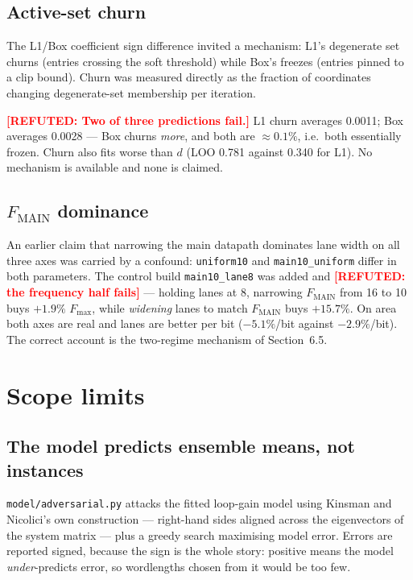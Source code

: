 \documentclass[11pt,a4paper]{article}
\newcommand{\refuted}[1]{\textcolor{red}{\textbf{[REFUTED: #1]}}}
\begin{document}
\subsection{Active-set churn}
The L1/Box coefficient sign difference invited a mechanism: L1's degenerate set
churns (entries crossing the soft threshold) while Box's freezes (entries
pinned to a clip bound). Churn was measured directly as the fraction of
coordinates changing degenerate-set membership per iteration.

\refuted{Two of three predictions fail.} L1 churn averages 0.0011; Box averages
0.0028 --- Box churns \emph{more}, and both are $\approx 0.1\%$, i.e.\ both
essentially frozen. Churn also fits worse than $d$ (LOO 0.781 against 0.340 for
L1). No mechanism is available and none is claimed.

\subsection{$F_{\text{MAIN}}$ dominance}
An earlier claim that narrowing the main datapath dominates lane width on all
three axes was carried by a confound: \texttt{uniform10} and
\texttt{main10\_uniform} differ in both parameters. The control build
\texttt{main10\_lane8} was added and \refuted{the frequency half fails} ---
holding lanes at 8, narrowing $F_{\text{MAIN}}$ from 16 to 10 buys $+1.9\%$
$F_{\max}$, while \emph{widening} lanes to match $F_{\text{MAIN}}$ buys
$+15.7\%$. On area both axes are real and lanes are better per bit
($-5.1\%$/bit against $-2.9\%$/bit). The correct account is the two-regime
mechanism of Section~6.5.

\section{Scope limits}

\subsection{The model predicts ensemble means, not instances}

\texttt{model/adversarial.py} attacks the fitted loop-gain model using Kinsman
and Nicolici's own construction --- right-hand sides aligned across the
eigenvectors of the system matrix --- plus a greedy search maximising model
error. Errors are reported signed, because the sign is the whole story:
positive means the model \emph{under}-predicts error, so wordlengths chosen
from it would be too few.
\end{document}
